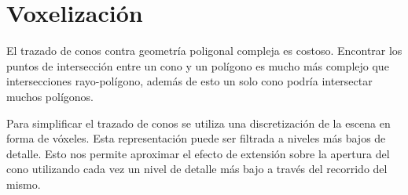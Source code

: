 \section{Voxelización} %
\label{sec:voxelizacion}
El trazado de conos contra geometría poligonal compleja es costoso. Encontrar los puntos de intersección entre un cono y un polígono es mucho más complejo que intersecciones rayo-polígono, además de esto un solo cono podría intersectar muchos polígonos.

Para simplificar el trazado de conos se utiliza una discretización de la escena en forma de vóxeles. Esta representación puede ser filtrada a niveles más bajos de detalle. Esto nos permite aproximar el efecto de extensión sobre la apertura del cono utilizando cada vez un nivel de detalle más bajo a través del recorrido del mismo.

